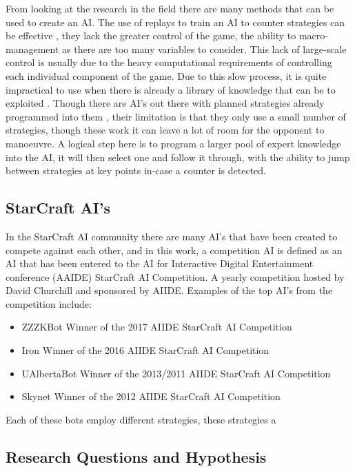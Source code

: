 \documentclass[journal]{IEEEtran}
\begin{document}
From looking at the research in the field there are many methods that can be used to create an AI. The use of replays to train an AI to counter strategies can be effective \cite{Bayesian}, they lack the greater control of the game, the ability to macro-management as there are too many variables to consider. This lack of large-scale control is usually due to the heavy computational requirements of controlling each individual component of the game.  Due to this slow process, it is quite impractical to use when there is already a library of knowledge that can be to exploited \cite{Liquid}. Though there are AI's out there with planned strategies already programmed into them \cite{ZZZK,Fuzzy}, their limitation is that they only use a small number of strategies, though these work it can leave a lot of room for the opponent to manoeuvre. A logical step here is to program a larger pool of expert knowledge into the AI, it will then select one and follow it through, with the ability to jump between strategies at key points in-case a counter is detected. 

\subsection{StarCraft AI's}
In the StarCraft AI community there are many AI's that have been created to compete against each other, and in this work, a competition AI is defined as an AI that has been entered to the AI for Interactive Digital Entertainment conference (AAIDE) StarCraft AI Competition. A yearly competition hosted by David Churchill and sponsored by AIIDE. Examples of the top AI's from the competition include:
\begin{itemize}
\item ZZZKBot Winner of the 2017 AIIDE StarCraft AI Competition \cite{ZZZK} 
\item Iron Winner of the 2016 AIIDE StarCraft AI Competition \cite{Iron}
\item UAlbertaBot Winner of the 2013/2011 AIIDE StarCraft AI Competition \cite{UAlberta}
\item Skynet Winner of the 2012 AIIDE StarCraft AI Competition \cite{Skynet}
\end{itemize}

Each of these bots employ different strategies, these strategies a

\subsection{Research Questions and Hypothesis}
\end{document}
